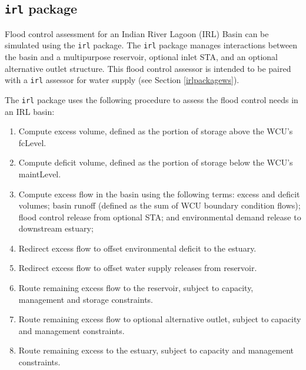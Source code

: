 \subsection{{\tt irl} package} \label{irlpackagefc}

Flood control assessment for an Indian River Lagoon (IRL) Basin can be
simulated using the {\tt irl} package. The {\tt irl} package manages
interactions between the basin and a multipurpose reservoir, optional
inlet STA, and an optional alternative outlet structure.  This flood
control assessor is intended to be paired with a {\tt irl} assessor
for water supply (see Section \ref{irlpackagews}).

The {\tt irl} package uses the following procedure to assess the flood
control needs in an IRL basin:

\begin{enumerate}

 \item Compute excess volume, defined as the portion of storage above
   the WCU's fcLevel.

 \item Compute deficit volume, defined as the portion of storage below
   the WCU's maintLevel.

 \item Compute excess flow in the basin using the following terms:
   excess and deficit volumes; basin runoff (defined as the sum of WCU
   boundary condition flows); flood control release from optional STA;
   and environmental demand release to downstream estuary;

 \item Redirect excess flow to offset environmental deficit to the
   estuary.

 \item Redirect excess flow to offset water supply releases from reservoir.

 \item Route remaining excess flow to the reservoir, subject to
   capacity, management and storage constraints.

 \item Route remaining excess flow to optional alternative outlet,
   subject to capacity and management constraints.

 \item Route remaining excess to the estuary, subject to capacity and
   management constraints.

\end{enumerate}

